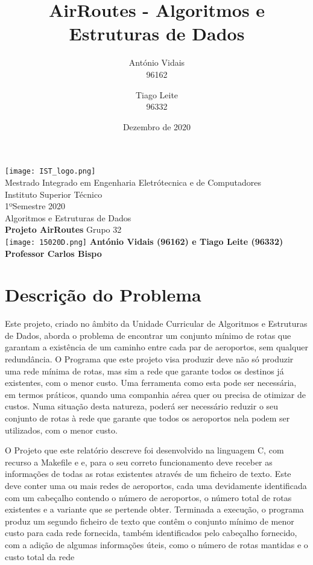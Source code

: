 \documentclass[14pt]{article}
\title{AirRoutes - Algoritmos e Estruturas de Dados}
\date{Dezembro de 2020}
\author{António Vidais \\96162 \and Tiago Leite \\96332}
\begin{document}
    \begin{titlepage}
        \begin{center}

            \texttt{[image: IST\_logo.png]}\\
            \vspace{0.5cm}
            Mestrado Integrado em Engenharia Eletrótecnica e de Computadores\\
            Instituto Superior Técnico\\
            1ºSemestre 2020\\
            Algoritmos e Estruturas de Dados\\
            \vspace*{1.5cm}
            \Huge
            \textbf{Projeto AirRoutes}
            \vspace{0.5cm}
            Grupo 32\\

                \vfill
                \texttt{[image: 15020D.png]}
                \vfill
            \Large
            \textbf{António Vidais (96162) e Tiago Leite (96332)}\\
            \textbf{Professor Carlos Bispo}
        \end{center}
    \end{titlepage}


    \section{Descrição do Problema} \label{sec:d.problema}
    Este projeto, criado no âmbito da Unidade Curricular de Algoritmos e Estruturas de Dados, aborda o problema de
    encontrar um conjunto mínimo de rotas que garantam a existência de um caminho entre cada par de aeroportos,
    sem qualquer redundância.
    O Programa que este projeto visa produzir deve não só produzir uma rede mínima de rotas, mas sim a rede que garante
    todos os destinos já existentes, com o menor custo.
    Uma ferramenta como esta pode ser necessária, em termos práticos, quando uma companhia aérea quer ou precisa de otimizar de custos.
    Numa situação desta natureza, poderá ser necessário reduzir o seu conjunto de rotas à rede que
    garante que todos os aeroportos nela podem ser utilizados, com o menor custo.

    O Projeto que este relatório descreve foi desenvolvido na linguagem C, com recurso a Makefile e  e, para o seu correto funcionamento deve
    receber as informações de todas as rotas existentes através de um ficheiro de texto.
    Este deve conter uma ou mais redes de aeroportos, cada uma devidamente identificada com um cabeçalho contendo o
    número de aeroportos, o número total de rotas existentes e a variante que se pertende obter.
    Terminada a execução, o programa produz um segundo ficheiro de texto que contêm o conjunto mínimo de menor custo
    para cada rede fornecida, também identificados pelo cabeçalho fornecido, com a adição de algumas informações úteis,
    como o número de rotas mantidas e o custo total da rede
\end{document}
